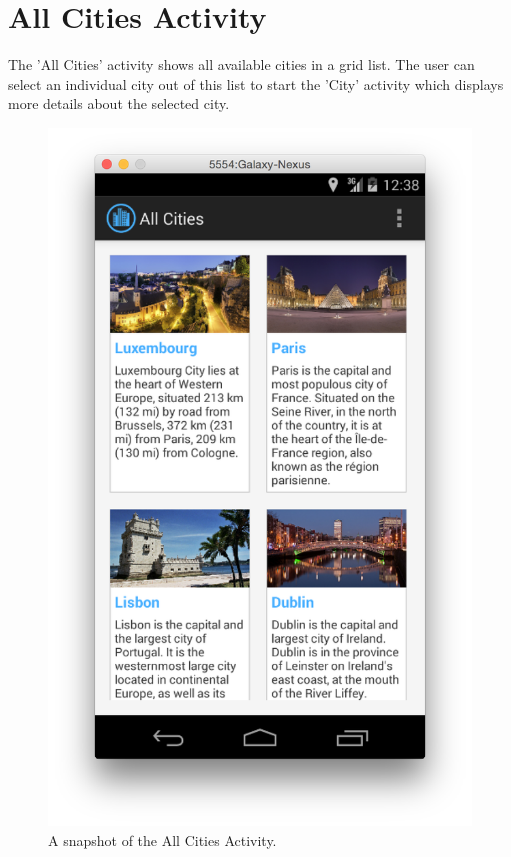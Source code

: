 \section{All Cities Activity}

The 'All Cities' activity shows all available cities in a grid list. The user can select an individual city out of this list to start the 'City' activity which displays more details about the selected city.

\begin{figure}[H]
	\centering
	\includegraphics[scale=0.4]{Figures/AllCitiesActivity}
	\caption{A snapshot of the All Cities Activity.}
\end{figure}

